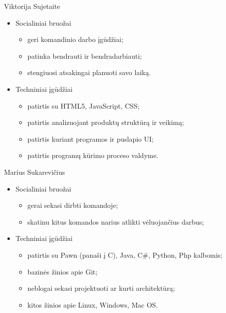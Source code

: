 \documentclass[11pt]{article}
\begin{document}
	Viktorija Sujetaite
	\begin{itemize}
		\item Socialiniai bruožai
		\begin{itemize}
			\item geri komandinio darbo įgūdžiai;
			\item patinka bendrauti ir bendradarbiauti;
			\item stengiuosi atsakingai planuoti savo laiką.
		\end{itemize}
		\item Techniniai įgūdžiai
		\begin{itemize}
			\item patirtis su HTML5, JavaScript, CSS;
			\item patirtis analizuojant produktų struktūrą ir veikimą;
			\item patirtis kuriant programos ir puslapio UI;
			\item patirtis programų kūrimo proceso valdyme.
		\end{itemize}
	\end{itemize}
	Marius Sukarevičius
	\begin{itemize}
		\item Socialiniai bruožai
		\begin{itemize}
			\item gerai sekasi dirbti komandoje;
			\item skatinu kitus komandos narius atlikti vėluojančius darbus;
		\end{itemize}
		\item Techniniai įgūdžiai
		\begin{itemize}
			\item patirtis su Pawn (panaši į C), Java, C#, Python, Php kalbomis;
			\item bazinės žinios apie Git;
			\item neblogai sekasi projektuoti ar kurti architektūrą;
			\item kitos žinios apie Linux, Windows, Mac OS.
		\end{itemize}
	\end{itemize}
\end{document}
